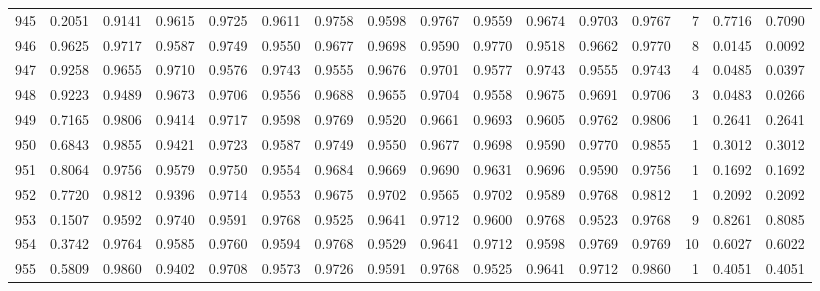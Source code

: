 \begin{tabular}{lrrrrrrrrrrrrrrr}
945 &      0.2051 &  0.9141 &  0.9615 &  0.9725 &  0.9611 &  0.9758 &  0.9598 &  0.9767 &  0.9559 &  0.9674 &   0.9703 &     0.9767 &      7 &                    0.7716 &                     0.7090 \\
946 &      0.9625 &  0.9717 &  0.9587 &  0.9749 &  0.9550 &  0.9677 &  0.9698 &  0.9590 &  0.9770 &  0.9518 &   0.9662 &     0.9770 &      8 &                    0.0145 &                     0.0092 \\
947 &      0.9258 &  0.9655 &  0.9710 &  0.9576 &  0.9743 &  0.9555 &  0.9676 &  0.9701 &  0.9577 &  0.9743 &   0.9555 &     0.9743 &      4 &                    0.0485 &                     0.0397 \\
948 &      0.9223 &  0.9489 &  0.9673 &  0.9706 &  0.9556 &  0.9688 &  0.9655 &  0.9704 &  0.9558 &  0.9675 &   0.9691 &     0.9706 &      3 &                    0.0483 &                     0.0266 \\
949 &      0.7165 &  0.9806 &  0.9414 &  0.9717 &  0.9598 &  0.9769 &  0.9520 &  0.9661 &  0.9693 &  0.9605 &   0.9762 &     0.9806 &      1 &                    0.2641 &                     0.2641 \\
950 &      0.6843 &  0.9855 &  0.9421 &  0.9723 &  0.9587 &  0.9749 &  0.9550 &  0.9677 &  0.9698 &  0.9590 &   0.9770 &     0.9855 &      1 &                    0.3012 &                     0.3012 \\
951 &      0.8064 &  0.9756 &  0.9579 &  0.9750 &  0.9554 &  0.9684 &  0.9669 &  0.9690 &  0.9631 &  0.9696 &   0.9590 &     0.9756 &      1 &                    0.1692 &                     0.1692 \\
952 &      0.7720 &  0.9812 &  0.9396 &  0.9714 &  0.9553 &  0.9675 &  0.9702 &  0.9565 &  0.9702 &  0.9589 &   0.9768 &     0.9812 &      1 &                    0.2092 &                     0.2092 \\
953 &      0.1507 &  0.9592 &  0.9740 &  0.9591 &  0.9768 &  0.9525 &  0.9641 &  0.9712 &  0.9600 &  0.9768 &   0.9523 &     0.9768 &      9 &                    0.8261 &                     0.8085 \\
954 &      0.3742 &  0.9764 &  0.9585 &  0.9760 &  0.9594 &  0.9768 &  0.9529 &  0.9641 &  0.9712 &  0.9598 &   0.9769 &     0.9769 &     10 &                    0.6027 &                     0.6022 \\
955 &      0.5809 &  0.9860 &  0.9402 &  0.9708 &  0.9573 &  0.9726 &  0.9591 &  0.9768 &  0.9525 &  0.9641 &   0.9712 &     0.9860 &      1 &                    0.4051 &                     0.4051 \\

\end{tabular}
